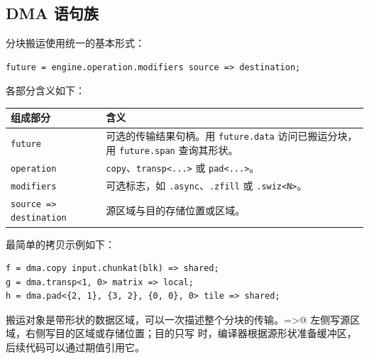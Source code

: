 \subsection*{DMA 语句族}

分块搬运使用统一的基本形式：

\begin{lstlisting}[language=croqtile,caption={DMA 的一般形式}]
future = engine.operation.modifiers source => destination;
\end{lstlisting}

各部分含义如下：

\begin{table}[htbp]\centering\small
\begin{tabularx}{\linewidth}{@{}lX@{}}
\toprule
组成部分 & 含义 \\
\midrule
\texttt{future} & 可选的传输结果句柄。用 \texttt{future.data} 访问已搬运分块，用 \texttt{future.span} 查询其形状。 \\
\texttt{operation} & \texttt{copy}、\texttt{transp\textless{}...\textgreater{}} 或 \texttt{pad\textless{}...\textgreater{}}。 \\
\texttt{modifiers} & 可选标志，如 \texttt{.async}、\texttt{.zfill} 或 \texttt{.swiz\textless{}N\textgreater{}}。 \\
\texttt{source =\textgreater{} destination} & 源区域与目的存储位置或区域。 \\
\bottomrule
\end{tabularx}
\end{table}

最简单的拷贝示例如下：

\begin{lstlisting}[language=croqtile,caption={一个具体的拷贝}]
f = dma.copy input.chunkat(blk) => shared;
g = dma.transp<1, 0> matrix => local;
h = dma.pad<{2, 1}, {3, 2}, {0, 0}, 0> tile => shared;
\end{lstlisting}

搬运对象是带形状的数据区域，可以一次描述整个分块的传输。\co@=>@ 左侧写源区域，右侧写目的区域或存储位置；目的只写 \co@shared@ 时，编译器根据源形状准备缓冲区，后续代码可以通过期值引用它。
